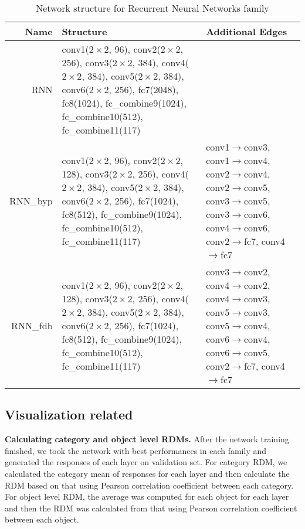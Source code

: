 \begin{table}[h]
\caption{Network structure for Recurrent Neural Networks family} %
\centering %
\begin{tabularx}{\textwidth}{r|X|X}
\hline\hline
Name & Structure & Additional Edges\\ [0.5ex]
\hline
RNN & conv1($2\times2$, 96), conv2($2\times2$, 256), conv3($2\times2$, 384), conv4($2\times2$, 384), conv5($2\times2$, 384), conv6($2\times2$, 256), fc7(2048), fc8(1024), fc\_combine9(1024), fc\_combine10(512), fc\_combine11(117) & \\
\hline
RNN\_byp & conv1($2\times2$, 96), conv2($2\times2$, 128), conv3($2\times2$, 256), conv4($2\times2$, 384), conv5($2\times2$, 384), conv6($2\times2$, 256), fc7(1024), fc8(512), fc\_combine9(1024), fc\_combine10(512), fc\_combine11(117) & conv1$\rightarrow$conv3, conv1$\rightarrow$conv4, conv2$\rightarrow$conv4, conv2$\rightarrow$conv5, conv3$\rightarrow$conv5, conv3$\rightarrow$conv6, conv4$\rightarrow$conv6, conv2$\rightarrow$fc7, conv4$\rightarrow$fc7\\
\hline
RNN\_fdb & conv1($2\times2$, 96), conv2($2\times2$, 128), conv3($2\times2$, 256), conv4($2\times2$, 384), conv5($2\times2$, 384), conv6($2\times2$, 256), fc7(1024), fc8(512), fc\_combine9(1024), fc\_combine10(512), fc\_combine11(117) & conv3$\rightarrow$conv2, conv4$\rightarrow$conv2, conv4$\rightarrow$conv3, conv5$\rightarrow$conv3, conv5$\rightarrow$conv4, conv6$\rightarrow$conv4, conv6$\rightarrow$conv5, conv2$\rightarrow$fc7, conv4$\rightarrow$fc7\\
\hline
\end{tabularx}
\label{tab:struct_rnn}
\end{table}

\subsection{Visualization related}
\label{sec:visual}

\textbf{Calculating category and object level RDMs.} After the network training finished, we took the network with best performances in each family and generated the responses of each layer on validation set. 
For category RDM, we calculated the category mean of responses for each layer and then calculate the RDM based on that using Pearson correlation coefficient between each category.
For object level RDM, the average was computed for each object for each layer and then the RDM was calculated from that using Pearson correlation coefficient between each object.

